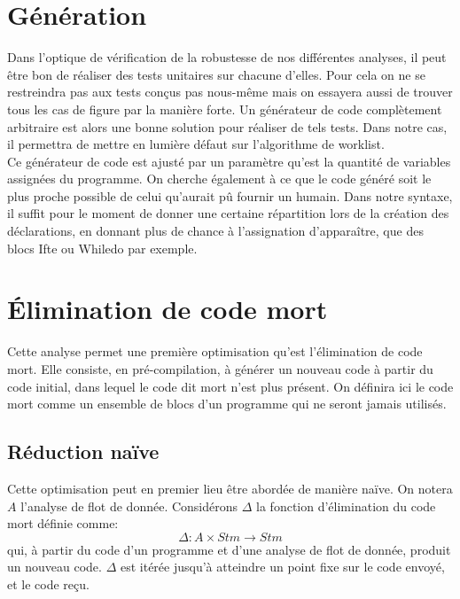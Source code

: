 \documentclass[a4paper, 12pt]{article}
\begin{document}
\section{Génération}
Dans l'optique de vérification de la robustesse de nos différentes analyses, il peut être bon de réaliser
des tests unitaires sur chacune d'elles. Pour cela on ne se restreindra pas aux tests conçus pas nous-même
mais on essayera aussi de trouver tous les cas de figure par la manière forte. Un générateur de code complètement
arbitraire est alors une bonne solution pour réaliser de tels tests. Dans notre cas, il permettra de mettre en
lumière défaut sur l'algorithme de worklist.
\\
Ce générateur de code est ajusté par un paramètre qu'est la quantité de variables assignées du programme. On
cherche également à ce que le code généré soit le plus proche possible de celui qu'aurait pû fournir un humain.
Dans notre syntaxe, il suffit pour le moment de donner une certaine répartition lors de la création des déclarations,
en donnant plus de chance à l'assignation d'apparaître, que des blocs Ifte ou Whiledo par exemple.

\section{Élimination de code mort}
Cette analyse permet une première optimisation qu'est l'élimination de code mort. Elle consiste, en pré-compilation,
à générer un nouveau code à partir du code initial, dans lequel le code dit mort n'est plus présent.
On définira ici le code mort comme un ensemble de blocs d'un programme qui ne seront jamais utilisés.

\subsection{Réduction naïve}
Cette optimisation peut en premier lieu être abordée de manière naïve. On notera $A$ l'analyse de flot de donnée.
Considérons $\Delta$ la fonction d'élimination du code mort définie comme:
\[\Delta : A \times Stm \longrightarrow Stm\]
qui, à partir du code d'un programme et d'une analyse de flot de donnée, produit un nouveau code. $\Delta$ est itérée
jusqu'à atteindre un point fixe sur le code envoyé, et le code reçu.	
\end{document}
